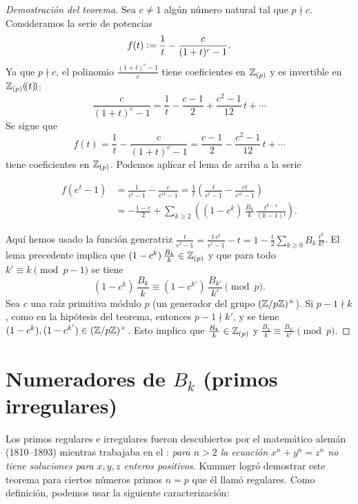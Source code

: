 \documentclass{article}
\begin{document}
\begin{proof}[Demostración del teorema]
Sea $c \ne 1$ algún número natural tal que $p \nmid c$. Consideramos la serie de potencias
$$f (t) \mathrel{\mathop:}= \frac{1}{t} - \frac{c}{(1+t)^c - 1}.$$
Ya que $p \nmid c$, el polinomio $\frac{(1+t)^c - 1}{c}$ tiene coeficientes en $\mathbb{Z}_{(p)}$ y es invertible en $\mathbb{Z}_{(p)} (\!(t)\!)$:
$$\frac{c}{(1+t)^c - 1} = \frac{1}{t} - \frac{c-1}{2} + \frac{c^2 - 1}{12}\,t + \cdots$$
Se sigue que
$$f (t) = \frac{1}{t} - \frac{c}{(1+t)^c - 1} = \frac{c-1}{2} - \frac{c^2 - 1}{12}\,t + \cdots$$
tiene coeficientes en $\mathbb{Z}_{(p)}$. Podemos aplicar el lema de arriba a la serie

\begin{align*}
f (e^t - 1) & = \frac{1}{e^t-1} - \frac{c}{e^{ct} - 1} = \frac{1}{t}\left(\frac{t}{e^t-1} - \frac{ct}{e^{ct} - 1}\right) \\
 & = -\frac{1-c}{2} + \sum_{k \ge 2} \left( (1-c^k)\,\frac{B_k}{k} \, \frac{t^{k-1}}{(k-1)!}\right).
\end{align*}

Aquí hemos usado la función generatriz $\frac{t}{e^t - 1} = \frac{t\,e^t}{e^t-1} - t = 1 - \frac{t}{2} \sum_{k \ge 0} B_k \, \frac{t^k}{k!}$. El lema precedente implica que $(1 - c^k)\,\frac{B_k}{k} \in \mathbb{Z}_{(p)}$ y que para todo $k' \equiv k \pmod{p-1}$ se tiene
$$(1-c^k)\,\frac{B_k}{k} \equiv (1-c^{k'})\,\frac{B_{k'}}{k'} \pmod{p}.$$
Sea $c$ una raíz primitiva módulo $p$ (un generador del grupo $(\mathbb{Z}/p\mathbb{Z})^\times$). Si $p-1 \nmid k$, como en la hipótesis del teorema, entonces $p-1 \nmid k'$, y se tiene $(1-c^k), (1-c^{k'}) \in (\mathbb{Z}/p\mathbb{Z})^\times$. Esto implica que $\frac{B_k}{k} \in \mathbb{Z}_{(p)}$ y $\frac{B_k}{k} \equiv \frac{B_{k'}}{k'} \pmod{p}$.
\end{proof}


\section*{Numeradores de $B_k$ (primos irregulares)}

Los primos regulares e irregulares fueron descubiertos por el matemático alemán  (1810--1893) mientras trabajaba en el : \emph{para $n > 2$ la ecuación $x^n + y^n = z^n$ no tiene soluciones para $x,y,z$ enteros positivos}. Kummer logró demostrar este teorema para ciertos números primos $n = p$ que él llamó regulares. Como definición, podemos usar la siguiente caracterización:
\end{document}
